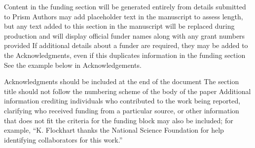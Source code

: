 \documentclass{osa-article}
\begin{document}
\begin{backmatter}

Content in the funding section will be generated entirely from details submitted to Prism
Authors may add placeholder text in the manuscript to assess length, but any text added to this section in the manuscript will be replaced during production and will display official funder names along with any grant numbers provided
If additional details about a funder are required, they may be added to the Acknowledgments, even if this duplicates information in the funding section
See the example below in Acknowledgements.

Acknowledgments should be included at the end of the document
The section title should not follow the numbering scheme of the body of the paper
Additional information crediting individuals who contributed to the work being reported, clarifying who received funding from a particular source, or other information that does not fit the criteria for the funding block may also be included; for example, ``K. Flockhart thanks the National Science Foundation for help identifying collaborators for this work.''

\end{backmatter}








\end{document}
